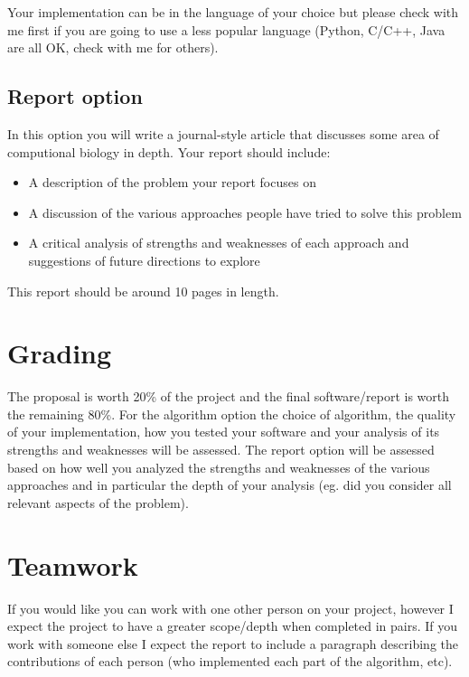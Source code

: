 \documentclass[12pt]{article}
\begin{document}
Your implementation can be in the language of your choice but please check with me first if you are going to use a less popular language (Python, C/C++, Java are all OK, check with me for others).

\subsection*{Report option}

In this option you will write a journal-style article that discusses some area of computional biology in depth. Your report should include:

\begin{itemize}
\item A description of the problem your report focuses on
\item A discussion of the various approaches people have tried to solve this problem
\item A critical analysis of strengths and weaknesses of each approach and suggestions of future directions to explore
\end{itemize}

This report should be around 10 pages in length.

\section*{Grading}

The proposal is worth 20\% of the project and the final software/report is worth the remaining 80\%. For the algorithm option the choice of algorithm, the quality of your implementation, how you tested your software and your analysis of its strengths and weaknesses will be assessed. The report option will be assessed based on how well you analyzed the strengths and weaknesses of the various approaches and in particular the depth of your analysis (eg. did you consider all relevant aspects of the problem).

\section*{Teamwork}

If you would like you can work with one other person on your project, however I expect the project to have a greater scope/depth when completed in pairs. If you work with someone else I expect the report to include a paragraph describing the contributions of each person (who implemented each part of the algorithm, etc).
\end{document}
